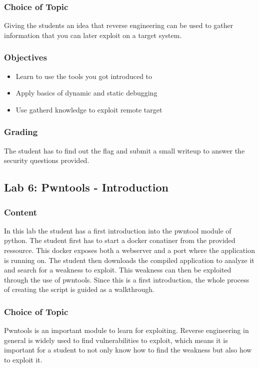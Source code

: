 \subsubsection*{Choice of Topic}
Giving the students an idea that reverse engineering can be used to gather information that you can later exploit on a target system.
\subsubsection*{Objectives}
\begin{itemize}
    \item Learn to use the tools you got introduced to
    \item Apply basics of dynamic and static debugging
    \item Use gatherd knowledge to exploit remote target
\end{itemize}
\subsubsection*{Grading}
The student has to find out the flag and submit a small writeup to answer the security questions provided.


\subsection{Lab 6: Pwntools - Introduction}
\subsubsection*{Content}
In this lab the student has a first introduction into the pwntool module of python. The student first has to start a docker conatiner from the provided ressource. This docker exposes both a webserver and a port where the application is running on. The student then downloads the compiled application to analyze it and search for a weakness to exploit. This weakness can then be exploited through the use of pwntools. Since this is a first introduction, the whole process of creating the script is guided as a walkthrough.
\subsubsection*{Choice of Topic}
Pwntools is an important module to learn for exploiting. Reverse engineering in general is widely used to find vulnerabilities to exploit, which means it is important for a student to not only know how to find the weakness but also how to exploit it.
